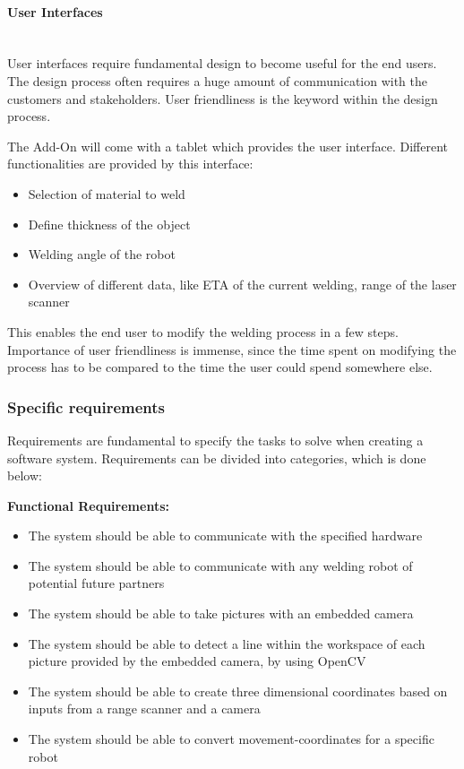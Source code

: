 \paragraph*{User Interfaces}~\\
User interfaces require fundamental design to become useful for the end users. The design process often requires a huge amount of communication with the customers and stakeholders. User friendliness is the keyword within the design process. 

The Add-On will come with a tablet which provides the user interface. Different functionalities are provided by this interface: 

\begin{itemize}

\item Selection of material to weld 
\item Define thickness of the object
\item Welding angle of the robot
\item Overview of different data, like ETA of the current welding, range of the laser scanner

\end{itemize}

This enables the end user to modify the welding process in a few steps. Importance of user friendliness is immense, since the time spent on modifying the process has to be compared to the time the user could spend somewhere else.

\subsubsection{Specific requirements}
Requirements are fundamental to specify the tasks to solve when creating a software system. Requirements can be divided into categories, which is done below:

\textbf{Functional Requirements:}
\begin{itemize}

\item The system should be able to communicate with the specified hardware
\item The system should be able to communicate with any welding robot of potential future partners
\item The system should be able to take pictures with an embedded camera 
\item The system should be able to detect a line within the workspace of each picture provided by the embedded camera, by using OpenCV
\item The system should be able to create three dimensional coordinates based on inputs from a range scanner and a camera
\item The system should be able to convert movement-coordinates for a specific robot

\end{itemize}

